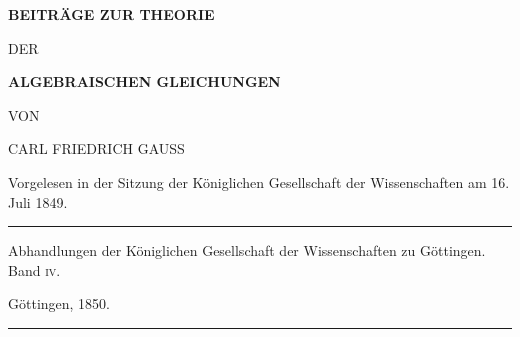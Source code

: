 \clearpage
{}
\thispagestyle{empty}
\begin{center}
\vspace*{.45in}
{\Large\bfseries BEITRÄGE ZUR THEORIE\par}
\bigskip
DER\par
\bigskip
{\Large\bfseries ALGEBRAISCHEN GLEICHUNGEN\par}
\bigskip\bigskip
VON\par
\bigskip
{\large CARL FRIEDRICH GAUSS\par}
\bigskip
Vorgelesen in der Sitzung der Königlichen Gesellschaft der Wissenschaften
am 16. Juli 1849.\par
\bigskip
\rule{0.6\linewidth}{0.4pt}\par
Abhandlungen der Königlichen Gesellschaft der Wissenschaften zu Göttingen.
Band \textsc{iv}.\par
Göttingen, 1850.\par
\rule{0.6\linewidth}{0.4pt}
\end{center}
\clearpage
